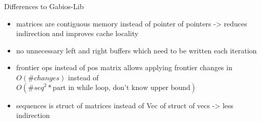 Differences to Gabios-Lib
\begin{itemize}
	\item matrices are contiguous memory instead of pointer of pointers -> reduces indirection and improves cache locality
	\item no unnecessary left and right buffers which need to be written each iteration
	\item frontier ops instead of pos matrix allows applying frontier changes in $O(\#changes)$ instead of $O(\#seq^2 * \text{part in while loop, don't know upper bound})$
	\item sequences is struct of matrices instead of Vec of struct of vecs -> less indirection
\end{itemize}

